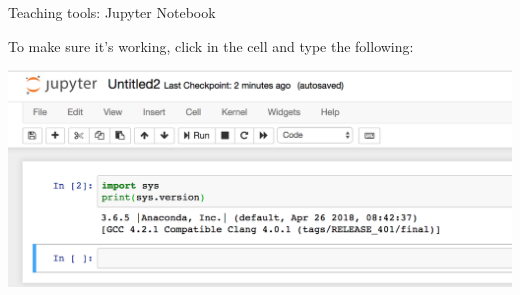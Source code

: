 \documentclass[11pt]{beamer}
\begin{document}
\begin{frame}{Teaching tools: Jupyter Notebook}

To make sure it’s working, click in the cell and type the following:

\begin{center}
\includegraphics[scale=.175]{../05-pictures/lesson-1-1_pic_30.PNG} 
\end{center}
\end{frame}
%
\end{document}
